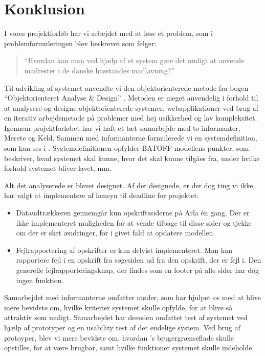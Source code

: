 \chapter{Konklusion}
\label{chap:konklusion}

I vores projektforløb har vi arbejdet med at løse et problem, som i problemformuleringen blev beskrevet som følger:

\begin{quote}
``Hvordan kan man ved hjælp af et system gøre det muligt at anvende madrester i de danske husstandes madlavning?''
\end{quote}

Til udvikling af systemet anvendte vi den objektorienterede metode fra bogen ``Objektorienteret Analyse \& Design'' \cite{ooad}. Metoden er meget anvendelig i forhold til at analysere og designe objektorienterede systemer, \fx webapplikationer ved brug af en iterativ arbejdsmetode på problemer med høj usikkerhed og lav kompleksitet.
Igennem projektforløbet har vi haft et tæt samarbejde med to informanter, Merete og Keld. Sammen med informanterne formulerede vi en systemdefinition, som kan ses i . Systemdefinitionen opfylder BATOFF-modellens punkter, som beskriver, hvad systemet skal kunne, hvor det skal kunne tilgåes fra, under hvilke forhold systemet bliver lavet, mm.

Alt det analyserede er blevet designet. Af det designede, er der dog ting vi ikke har valgt at implementere af hensyn til deadline for projektet:

\begin{itemize}[noitemsep]
\item Dataudtrækkeren gennemgår kun opskriftssiderne på Arla én gang. Der er ikke implementeret muligheden for at vende tilbage til disse sider og tjekke om der er sket ændringer, for i givet fald at opdatere modellen.
\item Fejlrapportering af opskrifter er kun delvist implementeret. Man kan rapportere fejl i en opskrift fra søgesiden ud fra den opskrift, der er fejl i. Den generelle fejlrapporteringsknap, der findes som en footer på alle sider har dog ingen funktion.
\end{itemize}

Samarbejdet med informanterne omfatter møder, som har hjulpet os med at blive mere bevidste om, hvilke kriterier systemet skulle opfylde, for at blive så attraktiv som muligt. Samarbejdet har desuden omfattet test af systemet ved hjælp af prototyper og en usability test af det endelige system. Ved brug af protoyper, blev vi mere bevidste om, hvordan \Foodl{}'s brugergrænseflade skulle opstilles, for at være brugbar, samt hvilke funktioner systemet skulle indeholde.

